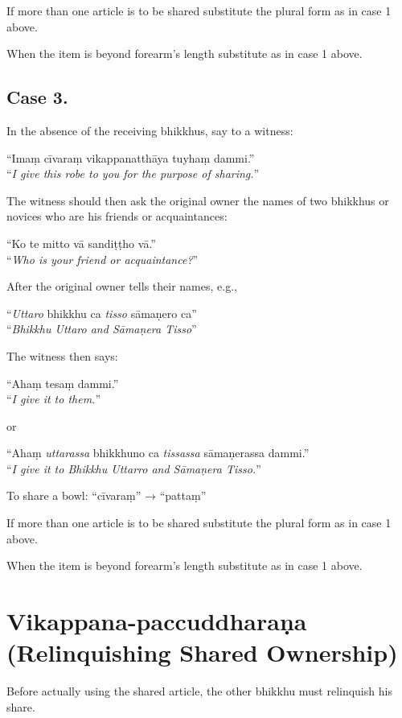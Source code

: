 If more than one article is to be shared substitute the plural form as in case 1 above.

When the item is beyond forearm’s length substitute as in case 1 above.


\subsection{Case 3.}

In the absence of the receiving bhikkhus, say to a witness:

“Imaṃ cīvaraṃ vikappanatthāya tuyhaṃ dammi.”\\
“\emph{I give this robe to you for the purpose of sharing.}”

The witness should then ask the original owner the names of two bhikkhus or
novices who are his friends or acquaintances:

“Ko te mitto vā sandiṭṭho vā.”\\
“\emph{Who is your friend or acquaintance?}”

After the original owner tells their names, e.g.,

“\emph{Uttaro} bhikkhu ca \emph{tisso} sāmaṇero ca”\\
“\emph{Bhikkhu Uttaro and Sāmaṇera Tisso}”

The witness then says:

“Ahaṃ tesaṃ dammi.”\\
“\emph{I give it to them.}”

or

“Ahaṃ \emph{uttarassa} bhikkhuno ca \emph{tissassa} sāmaṇerassa dammi.”\\
“\emph{I give it to Bhikkhu Uttarro and Sāmaṇera Tisso.}”


To share a bowl: “cīvaraṃ” → “pattaṃ”

If more than one article is to be shared substitute the plural form as in case 1
above.

When the item is beyond forearm’s length substitute as in case 1 above.

\section{Vikappana-paccuddharaṇa (Relinquishing Shared Ownership)}

Before actually using the shared article, the other bhikkhu must relinquish his
share.

